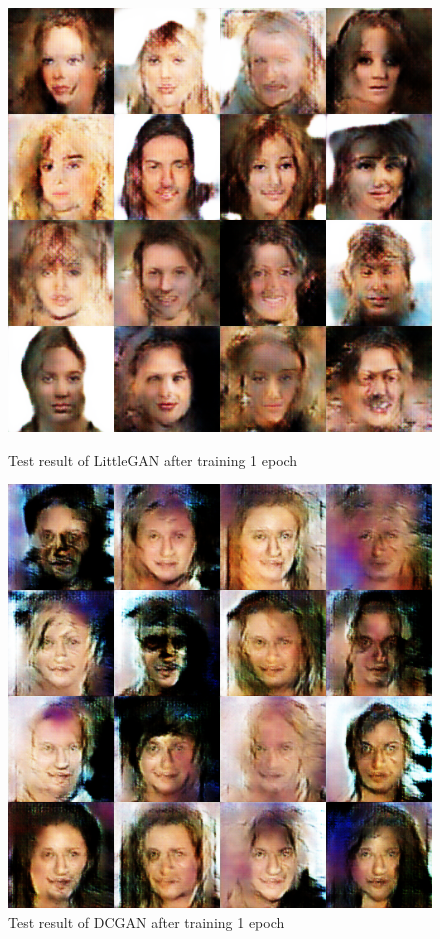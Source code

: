     \begin{figure}
        \begin{minipage}[t]{0.48\linewidth}
            \centering
            \includegraphics[width=\textwidth]{figures/result_littlegan_e1.png}
            \caption{Test result of LittleGAN after training 1 epoch}
            \label{littlegan_e1}
        \end{minipage}
            \hfill
        \begin{minipage}[t]{0.48\linewidth}
            \centering
            \includegraphics[width=\textwidth]{figures/result_dcgan_e1.png}
            \caption{Test result of DCGAN after training 1 epoch}
            \label{dcgan_e1}
        \end{minipage}
    \end{figure}